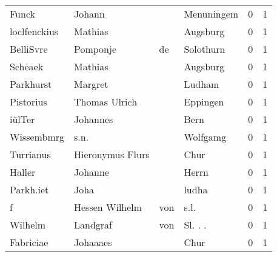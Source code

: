 \begin{tabular}{llllrr}
                    Funck &                             Johann &             &                                  Menuningem &          0 &         1 \\
             loclfenckius &                            Mathias &             &                                    Augsburg &          0 &         1 \\
                BelliSvre &                           Pomponje &          de &                                   Solothurn &          0 &         1 \\
                  Scheaek &                            Mathias &             &                                    Augsburg &          0 &         1 \\
                Parkhurst &                            Margret &             &                                      Ludham &          0 &         1 \\
                Pistorius &                      Thomas Ulrich &             &                                    Eppingen &          0 &         1 \\
                   iülTer &                           Johannes &             &                                        Bern &          0 &         1 \\
               Wissembmrg &                               s.n. &             &                                    Wolfgamg &          0 &         1 \\
                Turrianus &                   Hieronymus Flurs &             &                                        Chur &          0 &         1 \\
                   Haller &                            Johanne &             &                                       Herrn &          0 &         1 \\
                Parkh.iet &                               Joha &             &                                       ludha &          0 &         1 \\
                        f &                     Hessen Wilhelm &         von &                                        s.l. &          0 &         1 \\
                  Wilhelm &                           Landgraf &         von &                                    Sl. . .  &          0 &         1 \\
                Fabriciae &                           Johaaaes &             &                                        Chur &          0 &         1 \\

\end{tabular}
